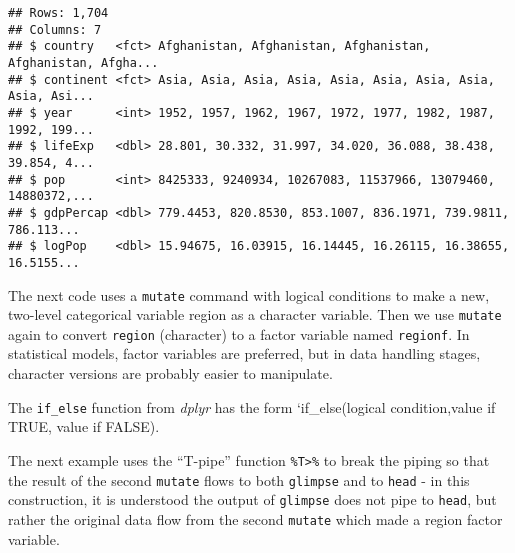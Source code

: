 \documentclass[
]{book}
\newenvironment{Shaded}{\begin{snugshade}}{\end{snugshade}}
\newcommand{\DataTypeTok}[1]{\textcolor[rgb]{0.13,0.29,0.53}{#1}}
\newcommand{\KeywordTok}[1]{\textcolor[rgb]{0.13,0.29,0.53}{\textbf{#1}}}
\newcommand{\NormalTok}[1]{#1}
\newcommand{\OperatorTok}[1]{\textcolor[rgb]{0.81,0.36,0.00}{\textbf{#1}}}
\newcommand{\StringTok}[1]{\textcolor[rgb]{0.31,0.60,0.02}{#1}}
\begin{document}
\begin{verbatim}
## Rows: 1,704
## Columns: 7
## $ country   <fct> Afghanistan, Afghanistan, Afghanistan, Afghanistan, Afgha...
## $ continent <fct> Asia, Asia, Asia, Asia, Asia, Asia, Asia, Asia, Asia, Asi...
## $ year      <int> 1952, 1957, 1962, 1967, 1972, 1977, 1982, 1987, 1992, 199...
## $ lifeExp   <dbl> 28.801, 30.332, 31.997, 34.020, 36.088, 38.438, 39.854, 4...
## $ pop       <int> 8425333, 9240934, 10267083, 11537966, 13079460, 14880372,...
## $ gdpPercap <dbl> 779.4453, 820.8530, 853.1007, 836.1971, 739.9811, 786.113...
## $ logPop    <dbl> 15.94675, 16.03915, 16.14445, 16.26115, 16.38655, 16.5155...
\end{verbatim}

The next code uses a \texttt{mutate} command with logical conditions to make a new, two-level categorical variable region as a character variable. Then we use \texttt{mutate} again to convert \texttt{region} (character) to a factor variable named \texttt{regionf}. In statistical models, factor variables are preferred, but in data handling stages, character versions are probably easier to manipulate.

The \texttt{if\_else} function from \emph{dplyr} has the form `if\_else(logical condition,value if TRUE, value if FALSE).

The next example uses the ``T-pipe'' function \texttt{\%T\textgreater{}\%} to break the piping so that the result of the second \texttt{mutate} flows to both \texttt{glimpse} and to \texttt{head} - in this construction, it is understood the output of \texttt{glimpse} does not pipe to \texttt{head}, but rather the original data flow from the second \texttt{mutate} which made a region factor variable.

\begin{Shaded}
\end{Shaded}
\end{document}
